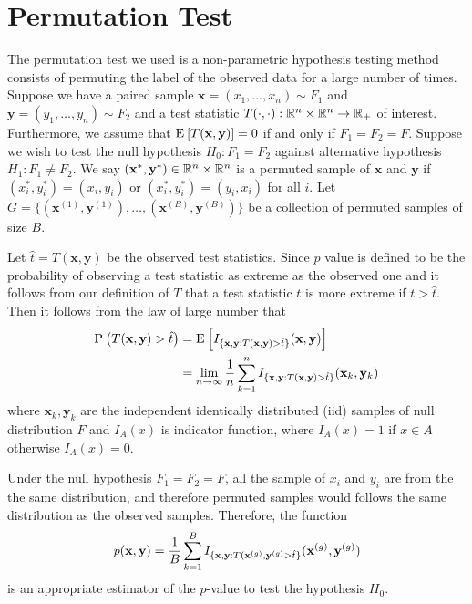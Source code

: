 \documentclass{report}
\begin{document}
\section{Permutation Test} \label{section: permutation test}

\par
The permutation test we used is a non-parametric hypothesis testing method consists of permuting the
label of the observed data for a large number of times. Suppose we have a paired sample
$\mathbf{x} = (x_1,\ldots, x_n) \sim F_1$ and $\mathbf{y} = (y_1,\ldots, y_n) \sim F_2$ and a test statistic $T(\cdot, \cdot) : \mathbb{R}^n \times \mathbb{R}^n \to \mathbb{R}_+$ of interest. Furthermore,
we assume that $\mathrm{E}_{} \left[ T(\mathbf{x}, \mathbf{y}) \right] =0$ if and only if $F_1 = F_2 = F$. Suppose we wish to test the null hypothesis $H_0 : F_1 = F_2$ against alternative hypothesis $H_1 : F_1 \neq F_2$.
We say $(\mathbf{x}^*, \mathbf{y}^*) \in \mathbb{R}^n \times \mathbb{R}^n$ is a permuted sample of $\mathbf{x}$ and $\mathbf{y}$ if $(x_i^*,y_i^*) = (x_i,y_i)$ or $(x_i^*,y_i^*) = (y_i,x_i)$ for all $i$. Let
$G = \{ (\mathbf{x}^{(1)}, \mathbf{y}^{(1)}), \ldots, (\mathbf{x}^{(B)}, \mathbf{y}^{(B)})\}$ be a collection of permuted samples of size $B$.

\par Let $\hat{t} = T(\mathbf{x},\mathbf{y})$ be the observed test statistics. Since $p$ value is defined to be the probability of observing a test statistic as extreme as the observed one and
it follows from our definition of $T$ that a test statistic $t$ is more extreme if $t > \hat{t}$. Then it follows from the law of large number that
\begin{align*}
    \mathrm{P}_{} \left( T(\mathbf{x},\mathbf{y}) > \hat{t} \right) &= \mathrm{E}_{} \left[ I_{\{\mathbf{x},\mathbf{y}: T(\mathbf{x},\mathbf{y}) > \hat{t}\}} (\mathbf{x},\mathbf{y}) \right]
    \\
    &= \lim_{n \to \infty} \frac{1}{n} \sum\limits_{k=1}^{n} I_{\{\mathbf{x},\mathbf{y}: T(\mathbf{x},\mathbf{y}) > \hat{t}\}}(\mathbf{x}_k,\mathbf{y}_k)
\end{align*}
where $\mathbf{x}_k,\mathbf{y}_k$ are the independent identically distributed (iid) samples of null distribution $F$ and $I_{A}(x)$ is indicator function, where
$I_A(x) = 1$ if $x \in A$ otherwise $I_A(x) = 0$.

\par
 Under the null hypothesis $F_1 = F_2 = F$, all the sample of $x_i$ and $y_i$ are from the the same distribution, and therefore permuted samples would follows
the same distribution as the observed samples. Therefore, the function
\[
    p(\mathbf{x},\mathbf{y}) = \frac{1}{B} \sum\limits_{k=1}^{B} I_{\{\mathbf{x},\mathbf{y}:T(\mathbf{x}^{(g)}, \mathbf{y}^{(g)} > \hat{t}\}}(\mathbf{x}^{(g)}, \mathbf{y}^{(g)})
\]
is an appropriate estimator of the $p$-value to test the hypothesis $H_0$.
\end{document}
